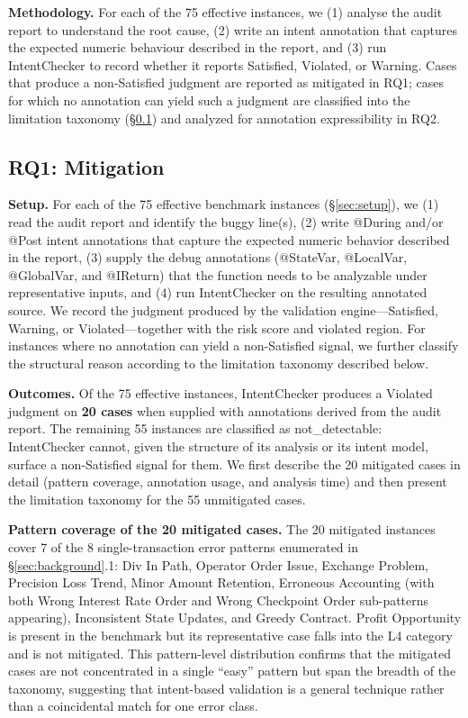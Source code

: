 \documentclass[pdflatex,sn-basic]{sn-jnl}%
\theoremstyle{thmstyleone}%
\theoremstyle{thmstyletwo}%
\theoremstyle{thmstylethree}%
\begin{document}
\smallskip\noindent\textbf{Methodology.}
For each of the 75 effective instances, we (1) analyse the audit report to understand the root cause,
(2) write an intent annotation that captures the expected numeric behaviour described in the report,
and (3) run IntentChecker to record whether it reports Satisfied, Violated, or Warning.
Cases that produce a non-Satisfied judgment are reported as mitigated in RQ1; cases for which no annotation can yield such a judgment are classified into the limitation taxonomy (§\ref{sec:rq1}) and analyzed for annotation expressibility in RQ2.

\subsection{RQ1: Mitigation}\label{sec:rq1}

\noindent\textbf{Setup.}
For each of the 75 effective benchmark instances (§\ref{sec:setup}), we (1) read the audit report and identify the buggy line(s), (2) write @During and/or @Post intent annotations that capture the expected numeric behavior described in the report, (3) supply the debug annotations (@StateVar, @LocalVar, @GlobalVar, and @IReturn) that the function needs to be analyzable under representative inputs, and (4) run IntentChecker on the resulting annotated source.
We record the judgment produced by the validation engine---Satisfied, Warning, or Violated---together with the risk score and violated region.
For instances where no annotation can yield a non-Satisfied signal, we further classify the structural reason according to the limitation taxonomy described below.

\smallskip
\noindent\textbf{Outcomes.}
Of the 75 effective instances, IntentChecker produces a Violated judgment on \textbf{20 cases} when supplied with annotations derived from the audit report.
The remaining 55 instances are classified as not\_detectable: IntentChecker cannot, given the structure of its analysis or its intent model, surface a non-Satisfied signal for them.
We first describe the 20 mitigated cases in detail (pattern coverage, annotation usage, and analysis time) and then present the limitation taxonomy for the 55 unmitigated cases.

\smallskip
\noindent\textbf{Pattern coverage of the 20 mitigated cases.}
The 20 mitigated instances cover 7 of the 8 single-transaction error patterns enumerated in §\ref{sec:background}.1: Div In Path, Operator Order Issue, Exchange Problem, Precision Loss Trend, Minor Amount Retention, Erroneous Accounting (with both Wrong Interest Rate Order and Wrong Checkpoint Order sub-patterns appearing), Inconsistent State Updates, and Greedy Contract.
Profit Opportunity is present in the benchmark but its representative case falls into the L4 category and is not mitigated.
This pattern-level distribution confirms that the mitigated cases are not concentrated in a single ``easy'' pattern but span the breadth of the taxonomy, suggesting that intent-based validation is a general technique rather than a coincidental match for one error class.
\end{document}

